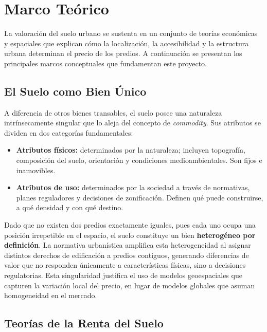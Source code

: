 \documentclass[12pt, letterpaper]{article}
\begin{document}
\section{Marco Teórico}

La valoración del suelo urbano se sustenta en un conjunto de teorías económicas
y espaciales que explican cómo la localización, la accesibilidad y la estructura
urbana determinan el precio de los predios. A continuación se presentan los
principales marcos conceptuales que fundamentan este proyecto.

\subsection{El Suelo como Bien Único}

A diferencia de otros bienes transables, el suelo posee una naturaleza
intrínsecamente singular que lo aleja del concepto de \textit{commodity}. Sus
atributos se dividen en dos categorías fundamentales:

\begin{itemize}[leftmargin=1.5em, itemsep=0.3em]
  \item \textbf{Atributos físicos:} determinados por la naturaleza; incluyen
        topografía, composición del suelo, orientación y condiciones
        medioambientales. Son fijos e inamovibles.
  \item \textbf{Atributos de uso:} determinados por la sociedad a través
        de normativas, planes reguladores y decisiones de zonificación. Definen
        qué puede construirse, a qué densidad y con qué destino.
\end{itemize}

Dado que no existen dos predios exactamente iguales, pues cada uno ocupa una
posición irrepetible en el espacio, el suelo constituye un bien
\textbf{heterogéneo por definición}. La normativa urbanística amplifica esta
heterogeneidad al asignar distintos derechos de edificación a predios contiguos,
generando diferencias de valor que no responden únicamente a características
físicas, sino a decisiones regulatorias. Esta singularidad justifica el uso de
modelos geoespaciales que capturen la variación local del precio, en lugar de
modelos globales que asuman homogeneidad en el mercado.

\subsection{Teorías de la Renta del Suelo}
\end{document}
